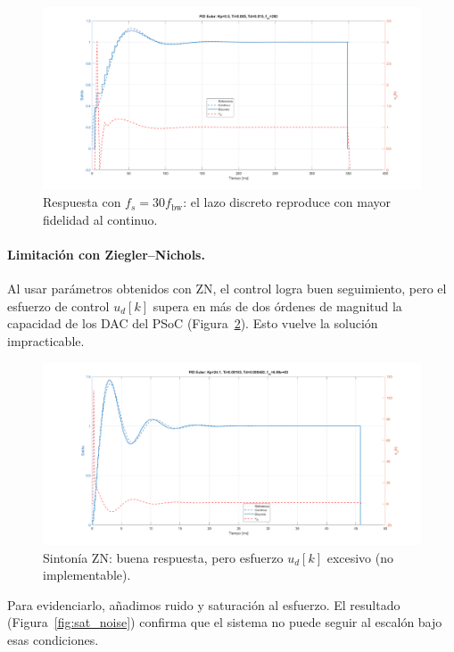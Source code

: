 \begin{figure}[!t]
	\centering
	\includegraphics[width=\columnwidth]{img/fs30.png}
	\caption{Respuesta con $f_s=30 f_{\mathrm{bw}}$: el lazo discreto reproduce con mayor fidelidad al continuo.}
	\label{fig:fs30}
\end{figure}

\paragraph{Limitación con Ziegler--Nichols.}  
Al usar parámetros obtenidos con ZN, el control logra buen seguimiento, pero el esfuerzo de control $u_d[k]$ supera en más de dos órdenes de magnitud la capacidad de los DAC del PSoC (Figura~\ref{fig:zn_effort}). Esto vuelve la solución impracticable.

\begin{figure}[!t]
	\centering
	\includegraphics[width=\columnwidth]{img/zn_effort.png}
	\caption{Sintonía ZN: buena respuesta, pero esfuerzo $u_d[k]$ excesivo (no implementable).}
	\label{fig:zn_effort}
\end{figure}

Para evidenciarlo, añadimos ruido y saturación al esfuerzo. El resultado (Figura~\ref{fig:sat_noise}) confirma que el sistema no puede seguir al escalón bajo esas condiciones.

